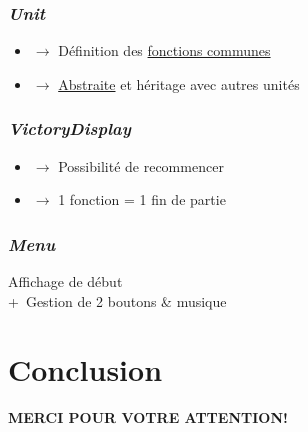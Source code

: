 \documentclass[12pt]{beamer}
\begin{document}

        \begin{frame}
            \frametitle{\emph{Unit}}\centering
            \pause
            \begin{itemize}
                \item{$\rightarrow$} Définition des \underline{fonctions communes}
                \pause
                \item{$\rightarrow$} \underline{Abstraite} et héritage avec autres unités
            \end{itemize}
        \end{frame}


        \begin{frame}
            \frametitle{\emph{VictoryDisplay}}\centering
            \pause
            \begin{itemize}
                \item{$\rightarrow$} Possibilité de recommencer
                \pause
                \item{$\rightarrow$} 1 fonction = 1 fin de partie %
            \end{itemize}
        \end{frame}
        \begin{frame}
            \frametitle{\emph{Menu}}\centering %
            \pause
            Affichage de début\\
            +~Gestion de 2 boutons \&{} musique
        \end{frame}

    \section{Conclusion} %
        
        \begin{frame}\thispagestyle{empty}\centering
            \Huge
            \textbf{MERCI POUR VOTRE ATTENTION!}
        \end{frame}
\end{document}
